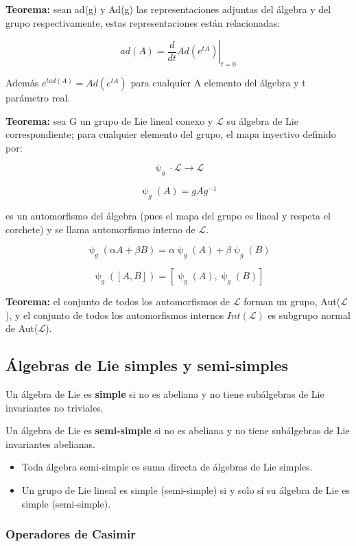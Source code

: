 \documentclass{article}
\begin{document}
     \smallskip
     \textbf{Teorema:} sean ad(g) y Ad(g) las representaciones adjuntas del álgebra y del grupo respectivamente, estas representaciones están relacionadas:

     $$ad(A)= \left . \frac{d}{dt}Ad(e^{tA})\right |_{t=0}$$

      Además $e^{t ad(A)}=Ad(e^{tA})$ para cualquier A elemento del álgebra y t parámetro real.

      \smallskip
      \textbf{Teorema:} sea G un grupo de Lie lineal conexo y $\mathcal{L}$ su álgebra de Lie correspondiente; para cualquier elemento del grupo, el mapa inyectivo definido por:

      $$\uppsi _g \cdot \mathcal{L} \to \mathcal{L}$$

      $$\uppsi _g (A)=gAg^{-1}$$

      es un automorfismo del álgebra (pues el mapa del grupo es lineal y respeta el corchete) y se llama automorfismo interno de $\mathcal{L}$.

      $$\uppsi _g (\alpha A + \beta B)=\alpha \uppsi _g (A) + \beta \uppsi _g (B)$$

      $$\uppsi _g ([A,B])=[\uppsi _g (A), \uppsi _g (B)]$$

      \smallskip
      \textbf{Teorema:} el conjunto de todos los automorfismos de $\mathcal{L}$ forman un grupo, Aut($\mathcal{L}$), y el conjunto de todos los automorfismos internos $Int(\mathcal{L})$ es subgrupo normal de Aut($\mathcal{L}$).

      \subsection{Álgebras de Lie simples y semi-simples}

      Un álgebra de Lie es \textbf{simple} si no es abeliana y no tiene subálgebras de Lie invariantes no triviales.

      Un álgebra de Lie es \textbf{semi-simple} si no es abeliana y no tiene subálgebras de Lie invariantes abelianas.

      \begin{itemize}
          \item Toda álgebra semi-simple es suma directa de álgebras de Lie simples.
     \item Un grupo de Lie lineal es simple (semi-simple) si y solo sí su álgebra de Lie es simple (semi-simple).
      \end{itemize}

      \subsubsection{Operadores de Casimir}
\end{document}
